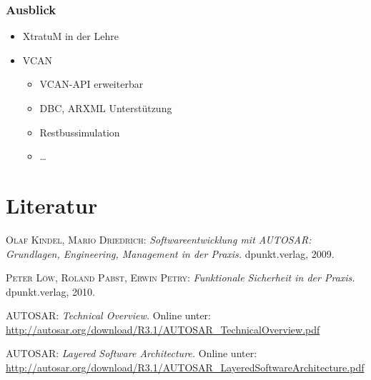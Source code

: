 \documentclass[]{beamer}
\begin{document}
\begin{frame}
\frametitle{Ausblick}
    \begin{itemize}
        \item XtratuM in der Lehre
        \item VCAN
        \begin{itemize}
            \item VCAN-API erweiterbar
            \item DBC, ARXML Unterstützung
            \item Restbussimulation
            \item \dots
        \end{itemize}
    \end{itemize}
\end{frame}










\appendix
\section*{Literatur}
\label{sec:Literatur}

\begin{frame}


\begin{thebibliography}{10}

 \textsc{Olaf Kindel, Mario Driedrich}: {\em Softwareentwicklung mit AUTOSAR: Grundlagen, Engineering, Management in der Praxis.} dpunkt.verlag, 2009.

 \textsc{Peter Löw, Roland Pabst, Erwin Petry}: {\em Funktionale Sicherheit in der Praxis.} dpunkt.verlag, 2010.

 \textsc{AUTOSAR}: {\em Technical Overview.} Online unter: \url{http://autosar.org/download/R3.1/AUTOSAR_TechnicalOverview.pdf}

 \textsc{AUTOSAR}: {\em Layered Software Architecture.} Online unter: \url{http://autosar.org/download/R3.1/AUTOSAR_LayeredSoftwareArchitecture.pdf}

\end{thebibliography}


\end{frame}
\end{document}
